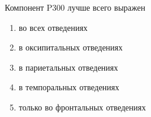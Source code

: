 
Компонент P300 лучше всего выражен

\begin{enumerate}
    \item во всех отведениях
    \item в оксипитальных отведениях
    \item в париетальных отведениях
    \item в темпоральных отведениях
    \item только во фронтальных отведениях
\end{enumerate}